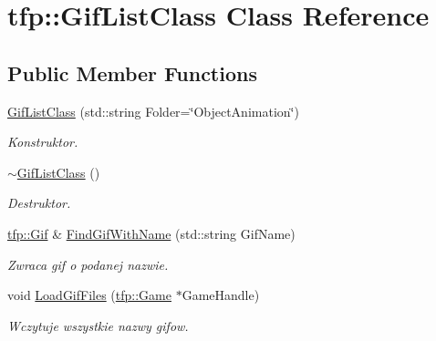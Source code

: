 \hypertarget{classtfp_1_1_gif_list_class}{}\section{tfp\+:\+:Gif\+List\+Class Class Reference}
\label{classtfp_1_1_gif_list_class}
\subsection*{Public Member Functions}
\begin{DoxyCompactItemize}
\item 
\mbox{\label{classtfp_1_1_gif_list_class_aaa04627faa7844b2e00f2e4320376a2a}} 
\mbox{\hyperlink{classtfp_1_1_gif_list_class_aaa04627faa7844b2e00f2e4320376a2a}{Gif\+List\+Class}} (std\+::string Folder=\char`\"{}Object\+Animation\char`\"{})
\begin{DoxyCompactList}\small\item\em Konstruktor. \end{DoxyCompactList}\item 
\mbox{\label{classtfp_1_1_gif_list_class_a2e06b6ff607ecec7b3bc8027dc5b18a1}} 
\mbox{\hyperlink{classtfp_1_1_gif_list_class_a2e06b6ff607ecec7b3bc8027dc5b18a1}{$\sim$\+Gif\+List\+Class}} ()
\begin{DoxyCompactList}\small\item\em Destruktor. \end{DoxyCompactList}\item 
\mbox{\label{classtfp_1_1_gif_list_class_add16a1441f28dc6158953746275fe2d4}} 
\mbox{\hyperlink{classtfp_1_1_gif}{tfp\+::\+Gif}} \& \mbox{\hyperlink{classtfp_1_1_gif_list_class_add16a1441f28dc6158953746275fe2d4}{Find\+Gif\+With\+Name}} (std\+::string Gif\+Name)
\begin{DoxyCompactList}\small\item\em Zwraca gif o podanej nazwie. \end{DoxyCompactList}\item 
void \mbox{\hyperlink{classtfp_1_1_gif_list_class_abf690db9e0de251abdfc8f5550f2b32b}{Load\+Gif\+Files}} (\mbox{\hyperlink{classtfp_1_1_game}{tfp\+::\+Game}} $\ast$Game\+Handle)
\begin{DoxyCompactList}\small\item\em Wczytuje wszystkie nazwy gifow. \end{DoxyCompactList}\item 

\end{DoxyCompactItemize}
